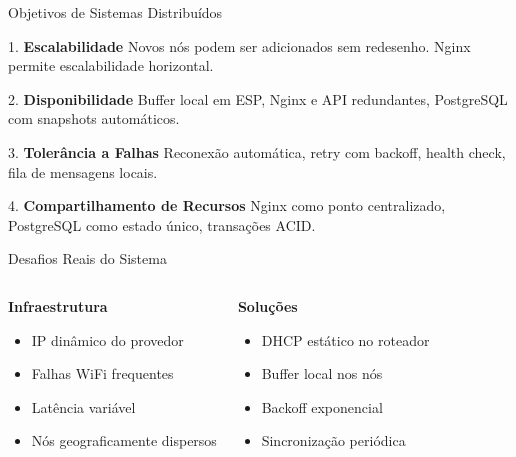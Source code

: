 \documentclass[12pt,aspectratio=16:9]{beamer}
\begin{document}
\begin{frame}{Objetivos de Sistemas Distribuídos}
    \begin{block}{1. \textbf{Escalabilidade}}
        Novos nós podem ser adicionados sem redesenho. Nginx permite escalabilidade horizontal.
    \end{block}
    
    \begin{block}{2. \textbf{Disponibilidade}}
        Buffer local em ESP, Nginx e API redundantes, PostgreSQL com snapshots automáticos.
    \end{block}
    
    \begin{block}{3. \textbf{Tolerância a Falhas}}
        Reconexão automática, retry com backoff, health check, fila de mensagens locais.
    \end{block}
    
    \begin{block}{4. \textbf{Compartilhamento de Recursos}}
        Nginx como ponto centralizado, PostgreSQL como estado único, transações ACID.
    \end{block}
\end{frame}

\begin{frame}{Desafios Reais do Sistema}
    \begin{columns}
        \begin{block}{\textbf{Infraestrutura}}
            \begin{itemize}
                \item IP dinâmico do provedor
                \item Falhas WiFi frequentes
                \item Latência variável
                \item Nós geograficamente dispersos
            \end{itemize}
        \end{block}
        
        \begin{block}{\textbf{Soluções}}
            \begin{itemize}
                \item DHCP estático no roteador
                \item Buffer local nos nós
                \item Backoff exponencial
                \item Sincronização periódica
            \end{itemize}
        \end{block}
    \end{columns}
\end{frame}
\end{document}
